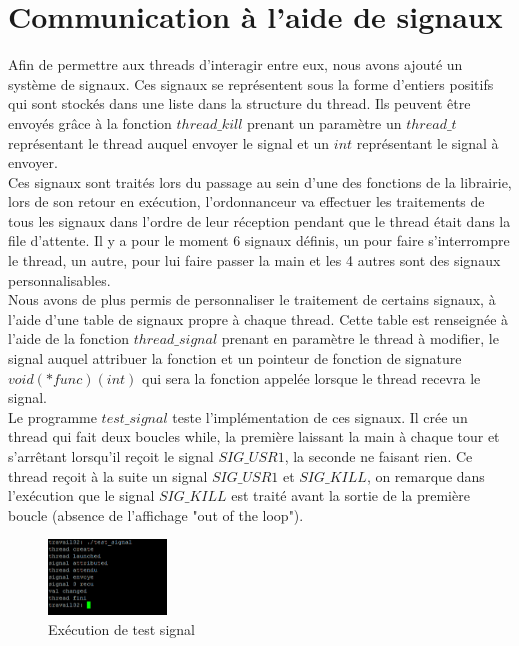 \section{Communication à l'aide de signaux}
	Afin de permettre aux threads d'interagir entre eux, nous
        avons ajouté un système de signaux.  Ces signaux se
        représentent sous la forme d'entiers positifs qui sont stockés
        dans une liste dans la structure du thread. Ils peuvent être
        envoyés grâce à la fonction $thread\_kill$ prenant un
        paramètre un $thread\_t$ représentant le thread auquel envoyer
        le signal et un $int$ représentant le signal à envoyer.\\
	
	Ces signaux sont traités lors du passage au sein d'une des
        fonctions de la librairie, lors de son retour en exécution,
        l'ordonnanceur va effectuer les traitements de tous les
        signaux dans l'ordre de leur réception pendant que le thread
        était dans la file d'attente. Il y a pour le moment 6 signaux
        définis, un pour faire s'interrompre le thread, un autre, pour
        lui faire passer la main et les 4 autres sont des signaux
        personnalisables.\\
	
	Nous avons de plus permis de personnaliser le traitement de
        certains signaux, à l'aide d'une table de signaux propre à
        chaque thread. Cette table est renseignée à l'aide de la
        fonction $thread\_signal$ prenant en paramètre le thread à
        modifier, le signal auquel attribuer la fonction et un
        pointeur de fonction de signature $void(*func)(int)$ qui sera
        la fonction appelée lorsque le thread recevra le signal.\\
	
	Le programme $test\_signal$ teste l'implémentation de ces
        signaux. Il crée un thread qui fait deux boucles while, la
        première laissant la main à chaque tour et s'arrêtant
        lorsqu'il reçoit le signal $SIG\_USR1$, la seconde ne faisant
        rien. Ce thread reçoit à la suite un signal $SIG\_USR1$ et
        $SIG\_KILL$, on remarque dans l'exécution que le signal
        $SIG\_KILL$ est traité avant la sortie de la première boucle
        (absence de l'affichage "out of the loop").\\
	
	
\begin{figure}[h]
  \begin{minipage}[c]{.45\linewidth}
    \begin{center}
      \includegraphics[height=2cm]{test_signal.png}
      \caption{Ex\'ecution de test signal}
      \label{test signal}
    \end{center}
  \end{minipage}
\end{figure}


